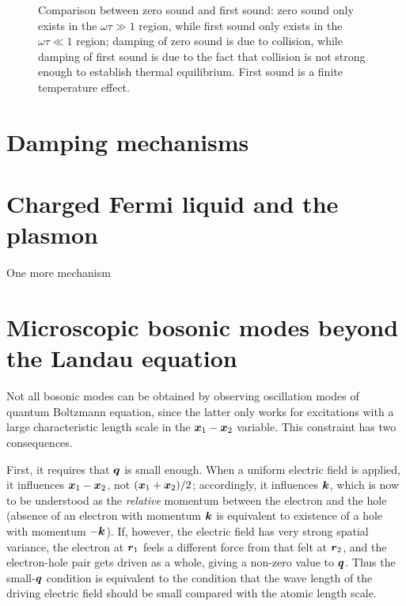 \documentclass[hyperref, a4paper]{article}
\begin{document}
\begin{figure}
    \centering
    
    \caption{Comparison between zero sound and first sound: 
    zero sound only exists in the $\omega \tau \gg 1$ region,
    while first sound only exists in the $\omega \tau \ll 1$ region;
    damping of zero sound is due to collision,
    while damping of first sound is due to the fact that
    collision is not strong enough to establish thermal equilibrium.
    First sound is a finite temperature effect.}
    \label{fig:sound-comparison}
\end{figure}

\section{Damping mechanisms}



\section{Charged Fermi liquid and the plasmon}

One more mechanism 

\section{Microscopic bosonic modes beyond the Landau equation}\label{sec:microscopic-bosonic-modes}

Not all bosonic modes can be obtained 
by observing oscillation modes of quantum Boltzmann equation,
since the latter only works for 
excitations with a large characteristic length scale 
in the $\vb*{x}_1 - \vb*{x}_2$ variable.
This constraint has two consequences.

First, it requires that $\vb*{q}$ is small enough.
When a uniform electric field is applied, 
it influences $\vb*{x}_1 - \vb*{x}_2$, not $(\vb*{x}_1 + \vb*{x}_2) / 2$;
accordingly, it influences $\vb*{k}$, 
which is now to be understood as the \emph{relative} momentum 
between the electron and the hole 
(absence of an electron with momentum $\vb*{k}$ 
is equivalent to existence of a hole with momentum $- \vb*{k}$).
If, however, the electric field has very strong spatial variance, 
the electron at $\vb*{r}_1$ feels a different force 
from that felt at $\vb*{r}_2$,
and the electron-hole pair gets driven as a whole,
giving a non-zero value to $\vb*{q}$.
Thus the small-$\vb*{q}$ condition is equivalent to 
the condition that the wave length of the driving electric field 
should be small compared with the atomic length scale.
\end{document}
